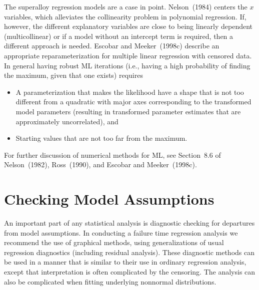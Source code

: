 The superalloy regression models are a case in point. Nelson~(1984)
centers the $x$ variables, which alleviates the collinearity problem
in polynomial regression. If, however, the different explanatory
variables are close to being linearly dependent (multicollinear) or
if a model without an intercept term is required, then a different
approach is needed.  Escobar and Meeker~(1998c) describe an
appropriate reparameterization for multiple linear regression with
censored data. In general having robust ML iterations (i.e., having
a high probability of finding the maximum, given that one exists)
requires
\begin{itemize}
\item
A parameterization that makes the likelihood have a shape that
is not too different from a quadratic with major axes corresponding to
the transformed model parameters (resulting in transformed parameter estimates
that are approximately uncorrelated), and
\item
Starting values that are not too far from the maximum.
\end{itemize}
For further discussion of numerical methods for ML, see Section~8.6 of
Nelson~(1982), Ross~(1990), and Escobar and Meeker~(1998c).

\section{Checking Model Assumptions}
\label{section:censored.data.regression.diagnostics}

An important part of any statistical analysis is diagnostic checking
for departures from model assumptions. In conducting a failure time
regression analysis we recommend the use of graphical methods, using
generalizations of usual regression diagnostics (including residual
analysis). These diagnostic
methods can be used in a manner that is similar to
their use in ordinary regression analysis, except that interpretation
is often complicated by the censoring. The analysis can also be
complicated when fitting underlying nonnormal distributions.
